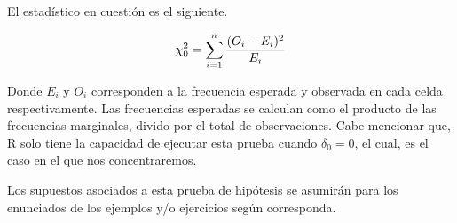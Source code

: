 \documentclass[
  11pt,
]{book}
\theoremstyle{definition}
\theoremstyle{definition}
\theoremstyle{definition}
\theoremstyle{definition}
\theoremstyle{remark}
\begin{document}
El estadístico en cuestión es el siguiente.

\begin{equation}
\notag
\chi^2_0 = \sum_{i=1}^n\frac{(O_i-E_i)^2}{E_i}
\end{equation}

Donde \(E_i\) y \(O_i\) corresponden a la frecuencia esperada y observada en cada celda respectivamente. Las frecuencias esperadas se calculan como el producto de las frecuencias marginales, divido por el total de observaciones. Cabe mencionar que, R solo tiene la capacidad de ejecutar esta prueba cuando \(\delta_0 = 0\), el cual, es el caso en el que nos concentraremos.

Los supuestos asociados a esta prueba de hipótesis se asumirán para los enunciados de los ejemplos y/o ejercicios según corresponda.
\end{document}
